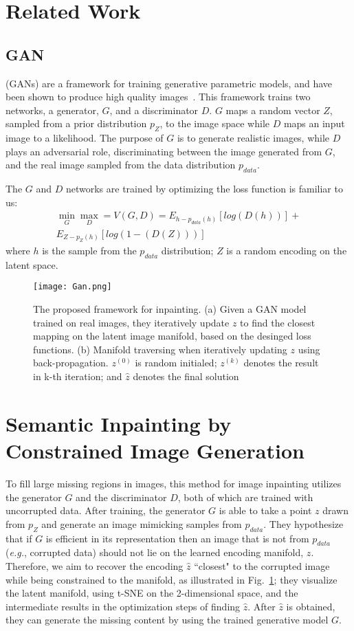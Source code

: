 \documentclass[10pt,twocolumn,letterpaper]{article}
\begin{document}
\section{Related Work}
\subsection{GAN}
(GANs) are a framework for training generative parametric models, and have been shown to produce high quality images~\cite{name4,name9,name32}. This framework trains two networks, a generator, $G$, and a discriminator $D$. $G$ maps a random vector $Z$, sampled from a prior distribution $p_Z$, to the image space while $D$ maps an input image to a likelihood. The purpose of $G$ is to generate realistic images, while $D$ plays an adversarial role, discriminating between the image generated from $G$, and the real image sampled from the data distribution $p_{data}$.
\par The $G$ and $D$ networks are trained by optimizing the loss
function is familiar to us:
\begin{equation}
\begin{split}
\min_{G}\max_{D}=V(G,D)=E_{h-p_{data}(h)}[log(D(h))]+\\E_{Z-p_{Z}(h)}[log(1-(D(Z)))]
\end{split}
\end{equation}
where $h$ is the sample from the $p_{data}$ distribution; $Z$ is a
random encoding on the latent space.
\begin{figure}[!htb]
	\centering
	\texttt{[image: Gan.png]}\\
	\caption{The proposed framework for inpainting. (a) Given a GAN model trained on real images, they iteratively update $z$ to find the closest mapping on the latent image manifold, based on the desinged loss functions. (b) Manifold traversing when iteratively updating $z$ using back-propagation. $z^{(0)}$ is random initialed; $z^{(k)}$ denotes the result in k-th iteration; and $\hat{z}$ denotes the final solution}\label{Figure2}
\end{figure}
\section{Semantic Inpainting by Constrained Image Generation}
To fill large missing regions in images, this method for image inpainting utilizes the generator $G$ and the discriminator $D$, both of which are trained with uncorrupted data. After training, the generator $G$ is able to take a point $z$ drawn from $p_Z$ and generate an image mimicking samples from $p_{data}$. They hypothesize that if $G$ is efficient in its representation then an image that is not from $p_{data}$ (\emph{e.g.}, corrupted data) should not lie on the learned encoding manifold, $z$. Therefore, we aim to recover the encoding $\hat{z}$ ``closest" to the corrupted image while being constrained to the manifold, as illustrated in Fig.~\ref{Figure2}; they visualize the latent manifold, using t-SNE on the 2-dimensional space, and the intermediate results in the optimization steps of finding $\hat{z}$. After $\hat{z}$ is obtained, they can generate the missing content by using the trained generative model $G$.


\end{document}
